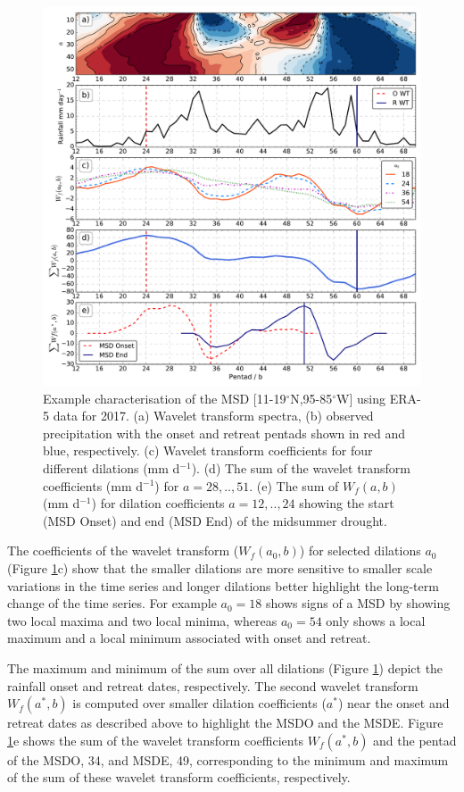 \begin{figure}[b!]
\centering
 \includegraphics[width=\linewidth]{figures/wav_fig4.pdf}
\caption[Wavelet transform characterisation of Midsummer drought]{ Example characterisation of the MSD [11-19$^\circ$N,95-85$^\circ$W] using ERA-5 data for 2017. (a) Wavelet transform spectra, (b) observed precipitation with the onset and retreat pentads shown in red and blue, respectively. (c) Wavelet transform coefficients for four different dilations (mm d$^{-1}$). (d) The sum of the wavelet transform coefficients (mm d$^{-1}$) for $a={28,..,51}$. (e) The sum of $W_f(a,b)$ (mm d$^{-1}$) for dilation coefficients $a={12,..,24}$ showing the start (MSD Onset) and end (MSD End) of the midsummer drought. }
\label{fig:5}
\end{figure}

The coefficients of the wavelet transform ($W_f(a_0,b)$) for selected dilations $a_0$  (Figure \ref{fig:5}c) show that the smaller dilations are more sensitive to smaller scale variations in the time series and longer dilations better highlight the long-term change of the time series. For example $a_0=18$ shows signs of a MSD by showing two local maxima and two local minima, whereas $a_0=54$ only shows a local maximum and a local minimum associated with onset and retreat.

The maximum and minimum of the sum over all dilations (Figure \ref{fig:5}) depict the rainfall onset and retreat dates, respectively. The second wavelet transform $W_f(a^*,b)$ is computed over smaller dilation coefficients ($a^*$) near the onset and retreat dates as described above to highlight the MSDO and the MSDE.
Figure \ref{fig:5}e shows the sum of the wavelet transform coefficients  $W_f(a^*,b)$ and the pentad of the MSDO, 34, and MSDE, 49, corresponding to the minimum and maximum of the sum of these wavelet transform coefficients, respectively.

